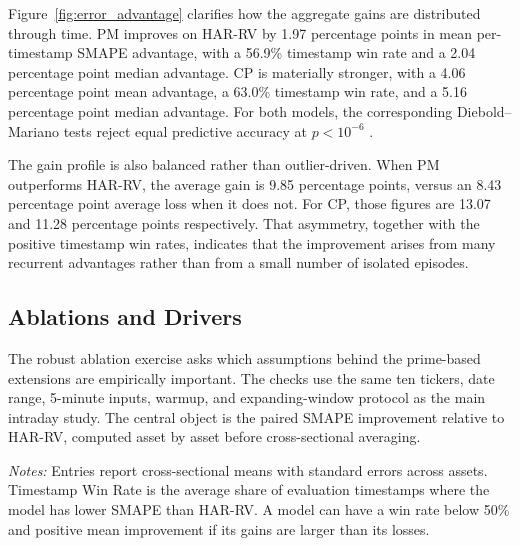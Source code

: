\documentclass[a4paper]{article}
\begin{document}
\noindent
Figure~\ref{fig:error_advantage} clarifies how the aggregate gains are distributed through time. PM improves on HAR-RV by 1.97 percentage points in mean per-timestamp SMAPE advantage, with a 56.9\% timestamp win rate and a 2.04 percentage point median advantage. CP is materially stronger, with a 4.06 percentage point mean advantage, a 63.0\% timestamp win rate, and a 5.16 percentage point median advantage. For both models, the corresponding Diebold--Mariano tests reject equal predictive accuracy at $p < 10^{-6}$ \cite{diebold1995}.

\noindent
The gain profile is also balanced rather than outlier-driven. When PM outperforms HAR-RV, the average gain is 9.85 percentage points, versus an 8.43 percentage point average loss when it does not. For CP, those figures are 13.07 and 11.28 percentage points respectively. That asymmetry, together with the positive timestamp win rates, indicates that the improvement arises from many recurrent advantages rather than from a small number of isolated episodes.

\subsection{Ablations and Drivers}

\noindent
The robust ablation exercise asks which assumptions behind the prime-based extensions are empirically important. The checks use the same ten tickers, date range, 5-minute inputs, warmup, and expanding-window protocol as the main intraday study. The central object is the paired SMAPE improvement relative to HAR-RV, computed asset by asset before cross-sectional averaging.

{\renewcommand{\thetable}{3}
\begin{center}
\label{tab:param_efficiency}
\small
\renewcommand{\arraystretch}{1.12}
\setlength{\tabcolsep}{5pt}
\resizebox{0.98\textwidth}{!}{}

\vspace{0.1cm}
\footnotesize \parbox{0.92\textwidth}{\textit{Notes:} Entries report cross-sectional means with standard errors across assets. Timestamp Win Rate is the average share of evaluation timestamps where the model has lower SMAPE than HAR-RV. A model can have a win rate below 50\% and positive mean improvement if its gains are larger than its losses.}
\end{center}}
\end{document}
